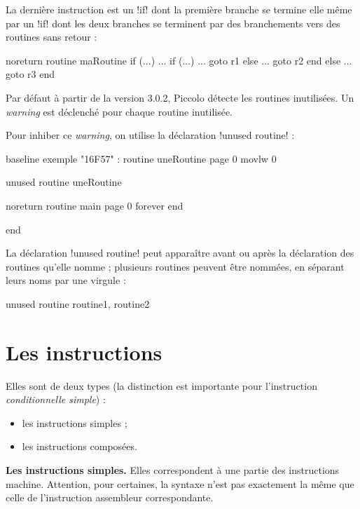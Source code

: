 La dernière instruction est un \pic!if! dont la première branche se termine elle même par un \pic!if! dont les deux branches se terminent par des branchements vers des routines sans retour :
\begin{piccolo}
noreturn routine maRoutine {
  if (...)
    ...
    if (...)
      ...
      goto r1
    else
      ...
      goto r2
    end
  else
    ...
    goto r3
  end
}
\end{piccolo}





Par défaut à partir de la version 3.0.2, Piccolo détecte les routines inutilisées. Un \emph{warning} est déclenché pour chaque routine inutilisée.

Pour inhiber ce \emph{warning}, on utilise la déclaration \pic!unused routine! :

\begin{piccolo}
baseline exemple "16F57" :
routine uneRoutine page 0 {
  movlw 0
}

unused routine uneRoutine
 
noreturn routine main page 0 {
  forever
  end
}

end
\end{piccolo}

La déclaration \pic!unused routine! peut apparaître avant ou après la déclaration des routines qu'elle nomme ; plusieurs routines peuvent être nommées, en séparant leurs noms par une virgule :
\begin{piccolo}
unused routine routine1, routine2
\end{piccolo}



\section{Les instructions}

Elles sont de deux types (la distinction est importante pour l’instruction \emph{conditionnelle simple}) :
\begin{itemize}
  \item les instructions simples ;
  \item les instructions composées.

\end{itemize}


\textbf{Les instructions simples.} Elles correspondent à une partie des instructions machine. Attention, pour certaines, la syntaxe n'est pas exactement la même que celle de l'instruction assembleur correspondante.

